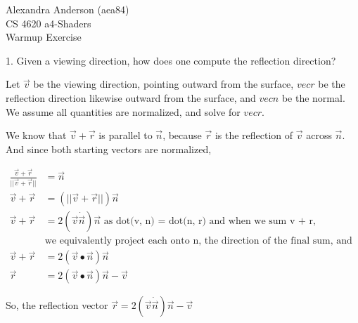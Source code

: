 \documentclass{letter}
\begin{document}
Alexandra Anderson (aea84) \\
CS 4620 a4-Shaders \\
Warmup Exercise

1. Given a viewing direction, how does one compute the reflection direction?

Let $\vec{v}$ be the viewing direction, pointing outward from the surface, $vec{r}$ be the reflection direction likewise outward from the surface, and $vec{n}$ be the normal. We assume all quantities are normalized, and solve for $vec{r}$. 

We know that $\vec{v} + \vec{r}$ is parallel to $\vec{n}$, because $\vec{r}$ is the reflection of $\vec{v}$ across $\vec{n}$. And since both starting vectors are normalized, 

\begin{align*}
\frac{\vec{v} + \vec{r}}{||\vec{v} + \vec{r}||} &= \vec{n} \\
\vec{v} + \vec{r} &= (||\vec{v} + \vec{r}||) \vec{n} \\
\vec{v} + \vec{r} &= 2(\vec{v} \dot \vec{n}) \vec{n} \text{ as dot(v, n) = dot(n, r) and when we sum v + r, } \\
& \text{we equivalently project each onto n, the direction of the final sum, and then add from there } \\
\vec{v} + \vec{r} &= 2(\vec{v} \bullet \vec{n}) \vec{n}  \\
\vec{r} &= 2(\vec{v} \bullet \vec{n}) \vec{n} - \vec{v}
\end{align*}

So, the reflection vector $\vec{r} = 2(\vec{v} \dot \vec{n}) \vec{n} - \vec{v} $
\end{document}
